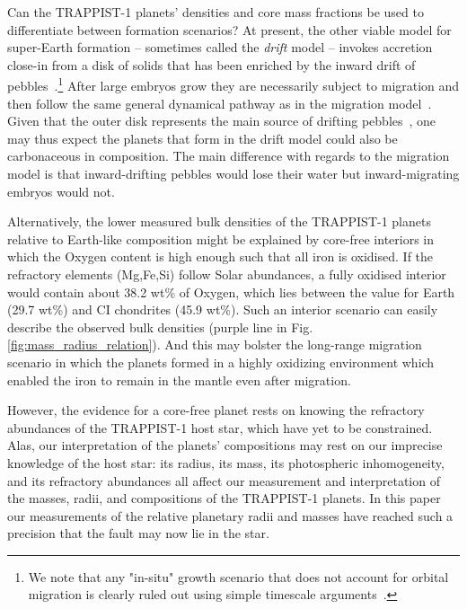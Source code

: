 \documentclass[twocolumn]{aastex63}
\begin{document}
Can the TRAPPIST-1 planets' densities and core mass fractions be used to differentiate between formation scenarios? At present, the other viable model for super-Earth formation -- sometimes called the {\em drift} model -- invokes accretion close-in from a disk of solids that has been enriched by the inward drift of pebbles~\citep{chatterjee14,chatterjee15,dawson15}.\footnote{We note that any "in-situ" growth scenario that does not account for orbital migration is clearly ruled out using simple timescale arguments~\citep[i.e., because migration -- and even aerodynamic drift -- is far too fast to ignore; see][]{ogihara15,inamdar15,izidoro2018}.} After large embryos grow they are necessarily subject to migration and then follow the same general dynamical pathway as in the migration model~\citep[involving resonant capture and later breaking of resonant chains; see discussion in][]{raymond18d}. Given that the outer disk represents the main source of drifting pebbles~\citep{lambrechts14,ida16}, one may thus expect the planets that form in the drift model could also be carbonaceous in composition. The main difference with regards to the migration model is that inward-drifting pebbles would lose their water but inward-migrating embryos would not. %

Alternatively, the lower measured bulk densities of the TRAPPIST-1 planets relative to Earth-like composition might be explained by core-free interiors \citep{ElkinsTanton2008} in which the Oxygen content is high enough such that all iron is oxidised. If the refractory elements (Mg,Fe,Si) follow Solar abundances, a fully oxidised interior would contain about 38.2 wt\% of Oxygen, which lies between the value for Earth (29.7 wt\%) and CI chondrites (45.9 wt\%). Such an interior scenario can easily describe the observed bulk densities (purple line in Fig. \ref{fig:mass_radius_relation}).  And this may bolster the long-range migration scenario in which the planets formed in a highly oxidizing environment which enabled the iron to remain in the mantle even after migration.  

However, the evidence for a core-free planet rests on knowing the refractory abundances of the TRAPPIST-1 host star, which have yet to be constrained.  Alas, our interpretation of the planets' compositions may rest on our imprecise knowledge of the host star:  its radius, its mass, its photospheric inhomogeneity, and its refractory abundances all affect our measurement and interpretation of the masses, radii, and compositions of the TRAPPIST-1 planets.  In this paper our measurements of the relative planetary radii and masses have reached such a precision that the fault may now lie in the star.
\end{document}
